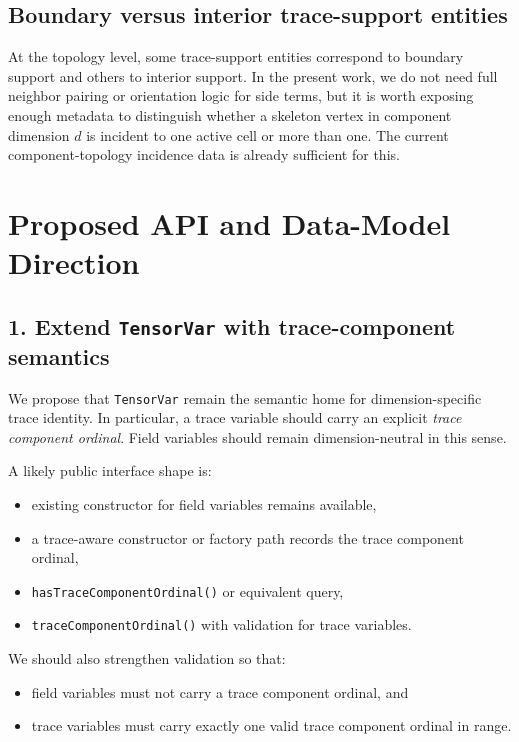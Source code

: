 \documentclass[11pt]{article}
\begin{document}
\subsection{Boundary versus interior trace-support entities}

At the topology level, some trace-support entities correspond to boundary support and others to interior support. In the present work, we do not need full neighbor pairing or orientation logic for side terms, but it is worth exposing enough metadata to distinguish whether a skeleton vertex in component dimension $d$ is incident to one active cell or more than one. The current component-topology incidence data is already sufficient for this.

\section{Proposed API and Data-Model Direction}

\subsection{1. Extend \texttt{TensorVar} with trace-component semantics}

We propose that \texttt{TensorVar} remain the semantic home for dimension-specific trace identity. In particular, a trace variable should carry an explicit \emph{trace component ordinal}. Field variables should remain dimension-neutral in this sense.

A likely public interface shape is:
\begin{itemize}[leftmargin=2em]
  \item existing constructor for field variables remains available,
  \item a trace-aware constructor or factory path records the trace component ordinal,
  \item \texttt{hasTraceComponentOrdinal()} or equivalent query,
  \item \texttt{traceComponentOrdinal()} with validation for trace variables.
\end{itemize}

We should also strengthen validation so that:
\begin{itemize}[leftmargin=2em]
  \item field variables must not carry a trace component ordinal, and
  \item trace variables must carry exactly one valid trace component ordinal in range.
\end{itemize}
\end{document}
